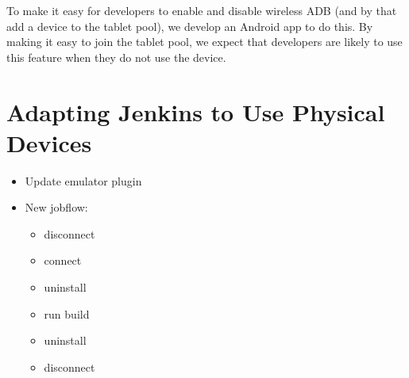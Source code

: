 To make it easy for developers to enable and disable wireless ADB (and by that add a device to the tablet pool), we develop an Android app to do this. By making it easy to join the tablet pool, we expect that developers are likely to use this feature when they do not use the device.

\section{Adapting Jenkins to Use Physical Devices}

\begin{itemize}
	\item Update emulator plugin
	\item New jobflow:
	\begin{itemize}
		\item disconnect
		\item connect
		\item uninstall
		\item run build
		\item uninstall
		\item disconnect
	\end{itemize}
\end{itemize}